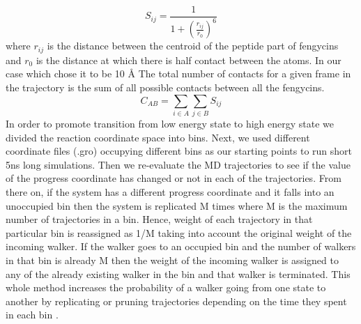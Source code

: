 \begin{equation}
\label{e:contact}
S_{ij} = \frac{1}{1+ \left ( \frac{r_{ij}}{r_0} \right)^6}
\end{equation}
where $r_{ij}$ is the distance between the centroid of the peptide part of fengycins and $r_0$ is the distance at which there is half contact between the atoms. In our case which chose it to be 10 \AA
The total number of contacts for a given frame in the trajectory is the sum of all possible contacts between all the fengycins.
\begin{equation}
\label{e:no_cont}
C_{AB} = \sum_{i \in A} \sum_{j \in B} S_{ij}
\end{equation}
In order to promote transition from low energy state to high energy state we divided the reaction coordinate space into bins.
Next, we used different coordinate files (.gro) occupying different bins as our starting points to run short 5ns long simulations. 
Then we re-evaluate the MD trajectories to see if the value of the progress coordinate has changed or not in each of the trajectories.
From there on, if the system has a different progress coordinate and it falls into an unoccupied bin then the system is replicated M times where M is the maximum number of trajectories in a bin. Hence, weight of each trajectory in that particular bin is reassigned as 1/M taking into account the original weight of the incoming walker.
 If the walker goes to an occupied bin
 and the number of walkers in that bin is already M then the weight of the incoming walker is assigned to any of the already
 existing walker in the bin and that walker is terminated.
 This whole method increases the probability of a walker going from one state to another
 by replicating or pruning trajectories depending on the time they spent in each bin \cite{WESTPA2015, Chong2017}.

